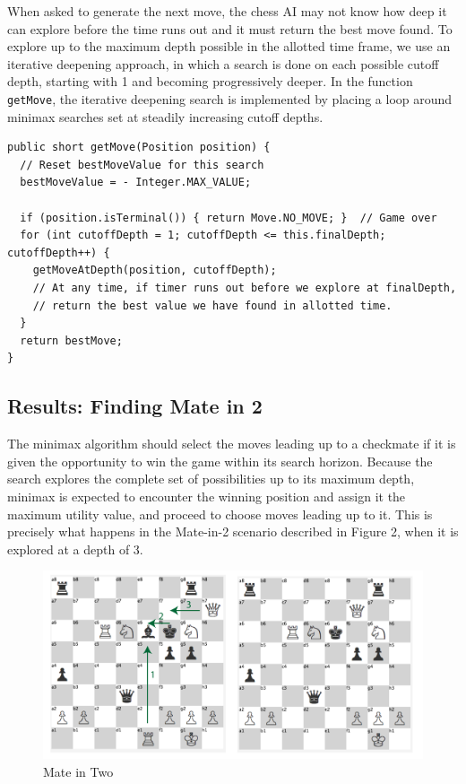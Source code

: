 \documentclass{article}
\begin{document}
When asked to generate the next move, the chess AI may not know how deep it can explore before the time runs out and it must return the best move found. To explore up to the maximum depth possible in the allotted time frame, we use an iterative deepening approach, in which a search is done on each possible cutoff depth, starting with 1 and becoming progressively deeper. In the function \verb`getMove`, the iterative deepening search is implemented by placing a loop around minimax searches set at steadily increasing cutoff depths.

 \begin{lstlisting}
public short getMove(Position position) {
  // Reset bestMoveValue for this search
  bestMoveValue = - Integer.MAX_VALUE;
  
  if (position.isTerminal()) { return Move.NO_MOVE; }  // Game over
  for (int cutoffDepth = 1; cutoffDepth <= this.finalDepth; cutoffDepth++) {
    getMoveAtDepth(position, cutoffDepth);
    // At any time, if timer runs out before we explore at finalDepth, 
    // return the best value we have found in allotted time.
  }
  return bestMove;
}
\end{lstlisting}

\subsection{Results: Finding Mate in 2}

The minimax algorithm should select the moves leading up to a checkmate if it is given the opportunity to win the game within its search horizon. Because the search explores the complete set of possibilities up to its maximum depth, minimax is expected to encounter the winning position and assign it the maximum utility value, and proceed to choose moves leading up to it. This is precisely what happens in the Mate-in-2 scenario described in Figure 2, when it is explored at a depth of 3.

\begin{figure}[!htb]
\centering
\includegraphics[scale=0.65]{mateintwo.pdf}
\caption{Mate in Two}
\end{figure}
\end{document}

